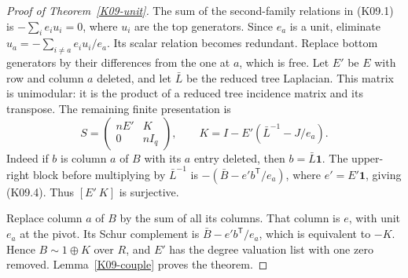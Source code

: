 \documentclass[11pt,a4paper]{article}
\theoremstyle{definition}\newtheorem{definition}[theorem]{Definition}
\theoremstyle{remark}\newtheorem{remark}[theorem]{Remark}
\numberwithin{equation}{section}
\begin{document}
\begin{proof}[Proof of Theorem~\ref{K09-unit}]
The sum of the second-family relations in (K09.1) is $-\sum_i e_i u_i=0$, where $u_i$ are the top generators. Since $e_a$ is a unit, eliminate $u_a=-\sum_{i\ne a}e_i u_i/e_a$. Its scalar relation becomes redundant. Replace bottom generators by their differences from the one at $a$, which is free. Let $E'$ be $E$ with row and column $a$ deleted, and let $\bar L$ be the reduced tree Laplacian. This matrix is unimodular: it is the product of a reduced tree incidence matrix and its transpose. The remaining finite presentation is
\[
 S=\begin{pmatrix}nE'&K\\0&nI_q\end{pmatrix},\qquad
 K=I-E'\left(\bar L^{-1}-J/e_a\right).                      \tag{K09.4}
\]
Indeed if $b$ is column $a$ of $B$ with its $a$ entry deleted, then $b=\bar L\boldsymbol1$. The upper-right block before multiplying by $\bar L^{-1}$ is $-(\bar B-e'b^{\mathsf T}/e_a)$, where $e'=E'\boldsymbol1$, giving (K09.4). Thus $[E'\ K]$ is surjective.

Replace column $a$ of $B$ by the sum of all its columns. That column is $e$, with unit $e_a$ at the pivot. Its Schur complement is $\bar B-e'b^{\mathsf T}/e_a$, which is equivalent to $-K$. Hence $B\sim1\oplus K$ over $R$, and $E'$ has the degree valuation list with one zero removed. Lemma~\ref{K09-couple} proves the theorem.
\end{proof}
\end{document}
